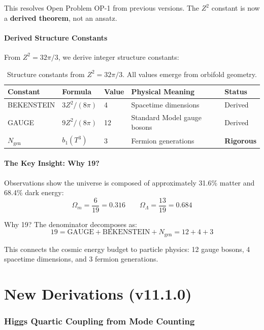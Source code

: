 \documentclass[11pt,a4paper]{article}
\theoremstyle{plain}
\theoremstyle{definition}
\theoremstyle{remark}
\newcommand{\Ngen}{N_{\text{gen}}}
\newcommand{\Omegam}{\Omega_m}
\newcommand{\OmegaL}{\Omega_\Lambda}
\newcommand{\GAUGE}{\text{GAUGE}}
\newcommand{\BEK}{\text{BEKENSTEIN}}
\begin{document}
This resolves Open Problem OP-1 from previous versions. The $Z^2$ constant is now a \textbf{derived theorem}, not an ansatz.

\subsection{Derived Structure Constants}

From $Z^2 = 32\pi/3$, we derive integer structure constants:

\begin{table}[h!]
\centering
\begin{tabular}{lllll}
\toprule
\textbf{Constant} & \textbf{Formula} & \textbf{Value} & \textbf{Physical Meaning} & \textbf{Status} \\
\midrule
BEKENSTEIN & $3Z^2/(8\pi)$ & 4 & Spacetime dimensions & Derived \\
GAUGE & $9Z^2/(8\pi)$ & 12 & Standard Model gauge bosons & Derived \\
$\Ngen$ & $b_1(T^3)$ & 3 & Fermion generations & \textbf{Rigorous} \\
\bottomrule
\end{tabular}
\caption{Structure constants from $Z^2 = 32\pi/3$. All values emerge from orbifold geometry.}
\end{table}

\subsection{The Key Insight: Why 19?}

Observations show the universe is composed of approximately 31.6\% matter and 68.4\% dark energy:
\[
\Omegam = \frac{6}{19} = 0.316 \qquad \OmegaL = \frac{13}{19} = 0.684
\]

Why 19? The denominator decomposes as:
\[
\boxed{19 = \GAUGE + \BEK + \Ngen = 12 + 4 + 3}
\]

This connects the cosmic energy budget to particle physics: 12 gauge bosons, 4 spacetime dimensions, and 3 fermion generations.

\part{New Derivations (v11.1.0)}

\section{Higgs Quartic Coupling from Mode Counting}
\label{sec:higgs}
\end{document}
